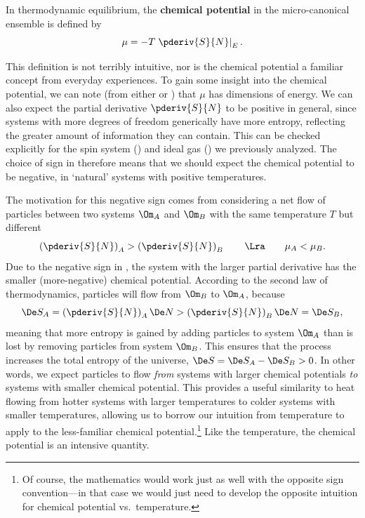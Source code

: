 \begin{shaded}
  In thermodynamic equilibrium, the \textbf{chemical potential} in the micro-canonical ensemble is defined by
  \begin{equation}
    \label{eq:chem_pot}
    \mu = -T \left. \pderiv{S}{N}\right|_E.
  \end{equation}
\end{shaded}

This definition is not terribly intuitive, nor is the chemical potential a familiar concept from everyday experiences.
To gain some insight into the chemical potential, we can note (from either  or ) that $\mu$ has dimensions of energy.
We can also expect the partial derivative $\pderiv{S}{N}$ to be positive in general, since systems with more degrees of freedom generically have more entropy, reflecting the greater amount of information they can contain.
This can be checked explicitly for the spin system () and ideal gas () we previously analyzed.
The choice of sign in  therefore means that we should expect the chemical potential to be negative, in `natural' systems with positive temperatures.

The motivation for this negative sign comes from considering a net flow of particles between two systems $\Om_A$ and $\Om_B$ with the same temperature $T$ but different
\begin{equation*}
  \left(\pderiv{S}{N}\right)_A > \left(\pderiv{S}{N}\right)_B \qquad \Lra \qquad \mu_A < \mu_B.
\end{equation*}
Due to the negative sign in , the system with the larger partial derivative has the smaller (more-negative) chemical potential.
According to the second law of thermodynamics, particles will flow from $\Om_B$ to $\Om_A$, because
\begin{equation*}
  \De S_A = \left(\pderiv{S}{N}\right)_A \De N > \left(\pderiv{S}{N}\right)_B \De N = \De S_B,
\end{equation*}
meaning that more entropy is gained by adding particles to system $\Om_A$ than is lost by removing particles from system $\Om_B$.
This ensures that the process increases the total entropy of the universe, $\De S = \De S_A - \De S_B > 0$.
In other words, we expect particles to flow \textit{from} systems with larger chemical potentials \textit{to} systems with smaller chemical potential.
This provides a useful similarity to heat flowing from hotter systems with larger temperatures to colder systems with smaller temperatures, allowing us to borrow our intuition from temperature to apply to the less-familiar chemical potential.\footnote{Of course, the mathematics would work just as well with the opposite sign convention---in that case we would just need to develop the opposite intuition for chemical potential vs.\ temperature.}
Like the temperature, the chemical potential is an intensive quantity.

